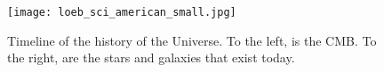 \begin{figure}[th]
	\centering
	\texttt{[image: loeb\_sci\_american\_small.jpg]}
	\caption[Epoch of Reionization Timeline]{Timeline of the history of the Universe. To the left, is the CMB. To the right, are the stars and galaxies that exist today.}
	\label{fig:reionization}
\end{figure}

